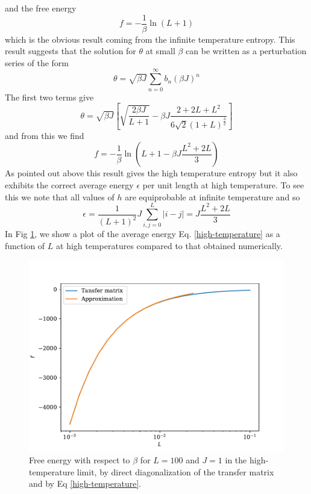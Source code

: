 and the free energy
\begin{equation}
f=-\frac{1}{\beta}\ln(L+1)
\end{equation}
which is the obvious result coming from the infinite temperature entropy. 
This result suggests that the solution for $\theta$ at small $\beta$ can be written as a perturbation series of the form
\begin{equation}
\theta = \sqrt{\beta J}\sum_{n=0}^\infty b_n (\beta J)^n
\end{equation}
The first two terms give
\begin{equation}
\theta = \sqrt{\beta J}\left[\sqrt{\frac{2\beta J}{L+1}} -\beta J \frac{2 + 2L +L^2}{6\sqrt{2}(1+L)^{\frac{3}{2}}}\right]
\end{equation}
and from this we find
\begin{equation}
f=-\frac{1}{\beta}\ln(L+1-\beta J\frac{L^2+2L}{3})
\end{equation}
As pointed out above this result gives the high temperature entropy but it also exhibits the correct average energy $\epsilon$ per unit length at high temperature. To see this we note that all values of $h$ are equiprobable at infinite temperature and so
\begin{equation}
\epsilon = \frac{1}{(L+1)^2} J \sum_{i,j=0}^L |i-j| = J\frac{L^2+2L}{3}
\label{high-temperature} 
\end{equation}
{\color{red}
In Fig \ref{fig-high-temp}, we show a plot of  the average energy Eq. \eqref{high-temperature} as a function of $L$ at high temperatures compared to that obtained numerically.
}
\begin{figure}
\centering
\includegraphics[width=0.7\linewidth]{int-dyn/high_temperature.pdf}
\caption{Free energy with respect to $\beta$ for $L=100$ and $J=1$ in the high-temperature limit, by direct diagonalization of the transfer matrix and by Eq \eqref{high-temperature}.}
\label{fig-high-temp} 
\end{figure}



